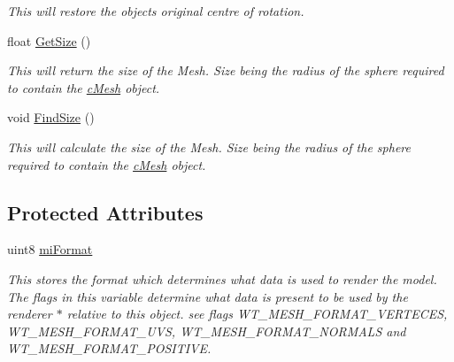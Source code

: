 \begin{DoxyCompactItemize}
\begin{DoxyCompactList}\small\item\em This will restore the objects original centre of rotation. \end{DoxyCompactList}\item 
\hypertarget{classc_mesh_a93bdde998cfebc274b7573444dc98d34}{
float \hyperlink{classc_mesh_a93bdde998cfebc274b7573444dc98d34}{GetSize} ()}
\label{classc_mesh_a93bdde998cfebc274b7573444dc98d34}

\begin{DoxyCompactList}\small\item\em This will return the size of the Mesh. Size being the radius of the sphere required to contain the \hyperlink{classc_mesh}{cMesh} object. \end{DoxyCompactList}\item 
\hypertarget{classc_mesh_abaa10891ab82ca5988bb255fda7cfdae}{
void \hyperlink{classc_mesh_abaa10891ab82ca5988bb255fda7cfdae}{FindSize} ()}
\label{classc_mesh_abaa10891ab82ca5988bb255fda7cfdae}

\begin{DoxyCompactList}\small\item\em This will calculate the size of the Mesh. Size being the radius of the sphere required to contain the \hyperlink{classc_mesh}{cMesh} object. \end{DoxyCompactList}\end{DoxyCompactItemize}
\subsection*{Protected Attributes}
\begin{DoxyCompactItemize}
\item 
\hypertarget{classc_mesh_a6a9c96e41eef3faed3c43ab69e8be5c6}{
uint8 \hyperlink{classc_mesh_a6a9c96e41eef3faed3c43ab69e8be5c6}{miFormat}}
\label{classc_mesh_a6a9c96e41eef3faed3c43ab69e8be5c6}

\begin{DoxyCompactList}\small\item\em This stores the format which determines what data is used to render the model. The flags in this variable determine what data is present to be used by the renderer $\ast$ relative to this object. see flags WT\_\-MESH\_\-FORMAT\_\-VERTECES, WT\_\-MESH\_\-FORMAT\_\-UVS, WT\_\-MESH\_\-FORMAT\_\-NORMALS and WT\_\-MESH\_\-FORMAT\_\-POSITIVE. \end{DoxyCompactList}\end{DoxyCompactItemize}


